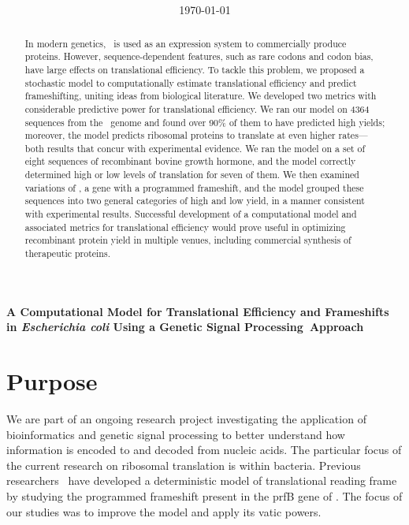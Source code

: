 \documentclass[12pt]{article}
\author{\sc{\BWFauthors}}
\date{{\sc \today}}
\title{\bf{\BWFtitle{\emph}}}
\newcommand{\BWFtitle}[2]{A Computational Model for Translational
  Efficiency and Frameshifts in #1{Escherichia coli} Using a Genetic Signal
  Processing#2Approach}
\begin{document}
\begin{singlespace}
  \tableofcontents
\end{singlespace}

\clearpage
\begin{Large}
\noindent\textbf{\BWFtitle{\emph}{~}}
\end{Large}
\begin{abstract}\begin{normalsize}
In modern genetics, \ecoli\ is used as an expression system to commercially 
produce proteins.  However, sequence-dependent features, such as rare codons 
and codon bias, have large effects on translational efficiency.  To tackle 
this problem, we proposed a stochastic model to computationally estimate 
translational efficiency and predict frameshifting, uniting ideas from biological 
literature. We developed two metrics with considerable predictive power 
for translational efficiency. We ran our model on 4364 sequences from the 
\ecoli\ genome and found over 90\% of them to have predicted high yields; 
moreover, the model predicts ribosomal proteins to translate at even higher rates---both 
results that concur with experimental evidence.  We ran the model on a set of eight 
sequences of recombinant bovine growth hormone, and the model correctly determined 
high or low levels of translation for seven of them.  We then examined variations of
\prfB, a gene with a programmed frameshift, and the model grouped these sequences 
into two general categories of high and low yield, in a manner consistent 
with experimental results.  Successful development of a computational model and 
associated metrics for translational efficiency would prove useful in optimizing 
recombinant protein yield in multiple venues, including commercial synthesis of 
therapeutic proteins.
\end{normalsize}\end{abstract}  
  
\clearpage
{}

\section{Purpose}
We are part of an ongoing research project
investigating the application of bioinformatics
and genetic signal processing to better understand how
information is encoded to and decoded from nucleic acids.  The particular
focus of the current research on ribosomal translation is within
bacteria.  Previous researchers~\cite{lalit:mechanics}
have developed a deterministic model
of translational reading frame by studying the
programmed frameshift present in the prfB gene of \ecoli.  The focus
of our studies was to improve the model and apply its vatic powers.
\end{document}
